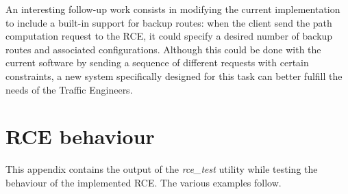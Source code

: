 \documentclass[10pt,a4paper]{report}
\begin{document}
An interesting follow-up work consists in modifying the current
implementation to include a built-in support for backup routes: when
the client send the path computation request to the RCE, it could
specify a desired number of backup routes and associated
configurations. Although this could be done with the current software
by sending a sequence of different requests with certain constraints,
a new system specifically designed for this task can better fulfill
the needs of the Traffic Engineers.

\cleardoublepage
{}
\renewcommand\bibname{References}
 \nocite{*}
 

\clearpage
\mbox{}
\clearpage

\appendix

\chapter{RCE behaviour}
This appendix contains the output of the \textit{rce\_test} utility
while testing the behaviour of the implemented RCE\@. The various
examples follow.
\end{document}
